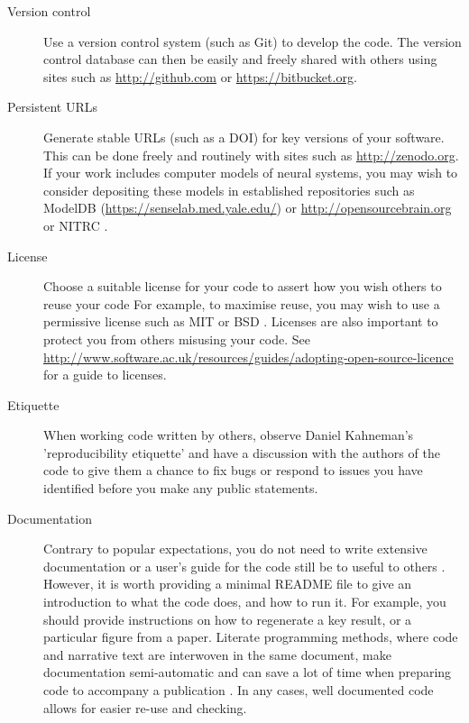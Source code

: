 \documentclass[11pt]{article}
\begin{document}
\begin{description}
\item [Version control] Use a version control system (such as Git) to
  develop the code.  The version control database can then be easily and freely
  shared with others using sites such as \url{http://github.com} \cite{Ram2013} or \url{https://bitbucket.org}.

\item [Persistent URLs] Generate stable URLs (such as a DOI) for key
  versions of your software.  This can be done freely and routinely with sites
  such as \url{http://zenodo.org}.  If your work includes computer
  models of neural systems, you may wish to consider depositing these
  models in established repositories such as ModelDB
  (\url{https://senselab.med.yale.edu/}) or
  \url{http://opensourcebrain.org} or NITRC \cite{poline_software_2014}.

\item [License] Choose a suitable license for your code to assert how you wish others to reuse your code  For example, to maximise reuse, you may wish to use a permissive license such as MIT or BSD \cite{Stodden2009}.  Licenses are also important to protect you from others misusing your code. See  \url{http://www.software.ac.uk/resources/guides/adopting-open-source-licence}  for a guide to licenses.

\item [Etiquette] When working code written by others, observe Daniel Kahneman's \cite{Kahneman2014} 'reproducibility etiquette' and have a discussion with the authors of the code to give them a chance to fix bugs or respond to issues you have identified before you make any public statements. 

\item [Documentation] Contrary to popular expectations, you do not
  need to write extensive documentation or a user's guide for the code
  still be to useful to others \cite{Barnes2010-iv}.  However, it is
  worth providing a minimal README file to give an introduction to
  what the code does, and how to run it.  For example, you should provide
  instructions on how to regenerate a key result, or a particular
  figure from a paper. Literate programming methods, where code and narrative text are interwoven in the same document, make documentation semi-automatic and can save a lot of time when preparing code to accompany a publication \cite{schulte2012multi, gentleman2012statistical}. In any cases, well documented code allows for easier re-use and checking.


\end{description}
\end{document}
